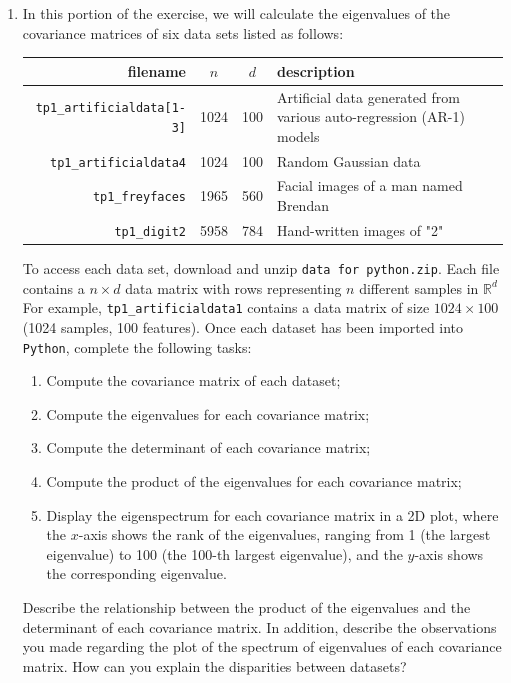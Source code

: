 \documentclass[a4paper]{article}
\begin{document}
\begin{enumerate}
	\item In this portion of the exercise, we will calculate the eigenvalues of the covariance matrices of six data sets listed as follows:
	      \begin{table}[H]
		      \centering
		      \begin{tabularx}{.7\textwidth}{rccX}
			      \hline
			      filename                          & $n$  & $d$ & description                                                          \\ \hline
			      \texttt{tp1\_artificialdata[1-3]} & 1024 & 100 & Artificial data generated from various auto-regression (AR-1) models \\
			      \texttt{tp1\_artificialdata4}     & 1024 & 100 & Random Gaussian data                                                 \\
			      \texttt{tp1\_freyfaces}           & 1965 & 560 & Facial images of a man named Brendan                                 \\
			      \texttt{tp1\_digit2}              & 5958 & 784 & Hand-written images of "2"                                           \\ \hline
		      \end{tabularx}
	      \end{table}
	      To access each data set, download and unzip \texttt{data for python.zip}.
	      Each file contains a $n \times d$ data matrix with rows representing $n$ different samples in $\mathbb{R}^d$
	      For example, \texttt{tp1\_artificialdata1} contains a data matrix of size $1024 \times 100$ (1024 samples, 100 features).
	      Once each dataset has been imported into \texttt{Python}, complete the following tasks:

	      \begin{enumerate}[label=(\alph*)]
		      \item Compute the covariance matrix of each dataset;

		      \item Compute the eigenvalues for each covariance matrix;

		      \item Compute the determinant of each covariance matrix;

		      \item Compute the product of the eigenvalues for each covariance matrix;

		      \item Display the eigenspectrum for each covariance matrix in a 2D plot, where the $x$-axis shows the rank of the eigenvalues, ranging from 1 (the largest eigenvalue) to 100 (the 100-th largest eigenvalue), and the $y$-axis shows the corresponding eigenvalue.
	      \end{enumerate}
	      Describe the relationship between the product of the eigenvalues and the
determinant of each covariance matrix. In addition, describe the observations
you made regarding the plot of the spectrum of eigenvalues of each covariance
matrix. How can you explain the disparities between datasets?


\end{enumerate}
\end{document}
